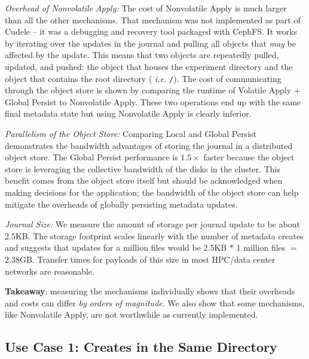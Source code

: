 {\it Overhead of Nonvolatile Apply:} The cost of Nonvolatile
Apply is much larger than all the other mechanisms.  That mechanism was not
implemented as part of Cudele -- it was a debugging and recovery tool packaged
with CephFS. It works by iterating over the updates in the journal and pulling
all objects that {\it may} be affected by the update.  This means that two
objects are repeatedly pulled, updated, and pushed: the object that houses the
experiment directory and the object that contains the root directory ({\it
i.e.} \texttt{/}).  The cost of communicating through the object store is shown
by comparing the runtime of Volatile Apply + Global Persist to
Nonvolatile Apply. These two operations end up with the same final metadata
state but using Nonvolatile Apply is clearly inferior.

{\it Parallelism of the Object Store:} Comparing Local and Global
Persist demonstrates the bandwidth advantages of storing the journal in a
distributed object store. The Global Persist
performance is \(1.5\times\) faster because the object store is leveraging the
collective bandwidth of the disks in the cluster. This benefit comes from the
object store itself but should be acknowledged when making decisions for the
application; the bandwidth of the object store can help mitigate the overheads of
globally persisting metadata updates.

{\it Journal Size:} We measure the amount of storage per journal update to be
about 2.5KB. The storage footprint scales linearly with the number of
metadata creates and suggests that updates for a million files would be 2.5KB
\(*\) 1 million files \(=\) 2.38GB. Transfer times for payloads of this size in
most HPC/data center networks are reasonable.

\textbf{Takeaway}: measuring the mechanisms individually shows that their
overheads and costs can differ {\it by orders of magnitude}. We also show that
some mechanisms, like Nonvolatile Apply, are not worthwhile as currently
implemented.

\subsection{Use Case 1: Creates in the Same Directory}
\label{sec:use-case-1}

